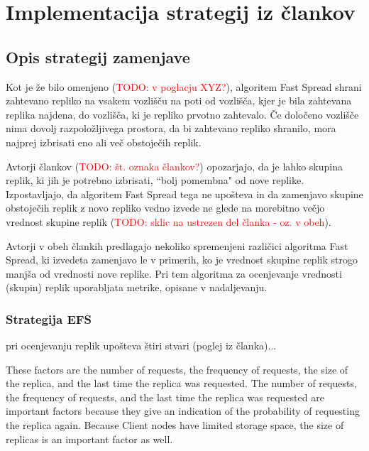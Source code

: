 \documentclass[a4paper, 12pt]{book}
\newcommand{\TODO}[1]{\textcolor{red}{TODO: #1}}
\begin{document}
\chapter{Implementacija strategij iz člankov}

\section{Opis strategij zamenjave}
Kot je že bilo omenjeno (\TODO{v poglacju XYZ?}), algoritem Fast Spread
shrani zahtevano repliko na vsakem vozlišču na poti od vozlišča, kjer je
bila zahtevana replika najdena, do vozlišča, ki je repliko prvotno
zahtevalo. Če določeno vozlišče nima dovolj razpoložljivega prostora,
da bi zahtevano repliko shranilo, mora najprej izbrisati eno ali več
obstoječih replik.

Avtorji člankov (\TODO{št. oznaka člankov?}) opozarjajo, da je lahko
skupina replik, ki jih je potrebno izbrisati, ``bolj pomembna" od
nove replike. Izpostavljajo, da algoritem Fast Spread tega ne upošteva in
da zamenjavo skupine obstoječih replik z novo repliko vedno
izvede ne glede na morebitno večjo vrednost skupine replik
(\TODO{sklic na ustrezen del članka - oz. v obeh}).

Avtorji v obeh člankih predlagajo nekoliko spremenjeni različici algoritma
Fast Spread, ki izvedeta zamenjavo le v primerih, ko je vrednost skupine
replik strogo manjša od vrednosti nove replike. Pri tem algoritma za
ocenjevanje vrednosti (skupin) replik uporabljata metrike, opisane v
nadaljevanju.

\subsection{Strategija EFS}

pri ocenjevanju replik upošteva štiri stvari (poglej iz članka)...

These factors are the number of
requests, the frequency of requests, the size of the replica, and the
last time the replica was requested. The number of requests,
the frequency of requests, and the last time the replica was
requested are important factors because they give an indication
of the probability of requesting the replica again. Because Client
nodes have limited storage space, the size of replicas is an
important factor as well.
\end{document}
